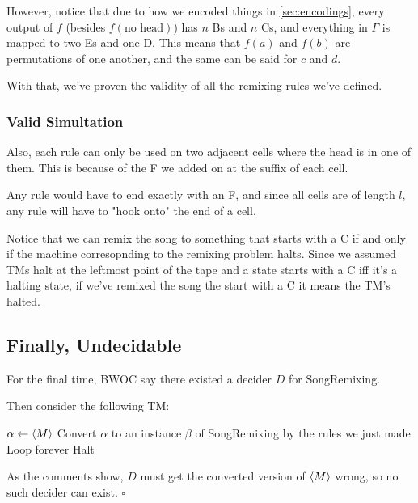 \documentclass[12pt]{article}
\begin{document}
However, notice that due to how we encoded things in \ref{sec:encodings},
every output of $f$ (besides $f(\text{no head})$) has $n$ Bs and $n$ Cs,
and everything in $\Gamma$ is mapped to two Es and one D.
This means that $f(a)$ and $f(b)$ are permutations of one another,
and the same can be said for $c$ and $d$.

With that, we've proven the validity of all the remixing rules we've defined.

\subsubsection{Valid Simultation}

Also, each rule can only be used on two adjacent cells where the head is in one of them.
This is because of the F we added on at the suffix of each cell.

Any rule would have to end exactly with an F, and since all cells are of length $l$,
any rule will have to "hook onto" the end of a cell.

Notice that we can remix the song to something that starts with a C
if and only if the machine corresopnding to the remixing problem halts.
Since we assumed TMs halt at the leftmost point of the tape
and a state starts with a C iff it's a halting state,
if we've remixed the song the start with a C it means the TM's halted.

\pagebreak

\subsection{Finally, Undecidable}

For the final time, BWOC say there existed a decider $D$ for SongRemixing.

Then consider the following TM:
\begin{algorithmic}[1]
        \State $\alpha \gets \Braket{M}$
        \State Convert $\alpha$ to an instance $\beta$ of SongRemixing by the rules we just made
            \State Loop forever
            \State Halt
        \EndIf
    \EndProcedure
\end{algorithmic}
As the comments show, $D$ must get the converted version of $\Braket{M}$ wrong,
so no such decider can exist. $\square$
\end{document}
